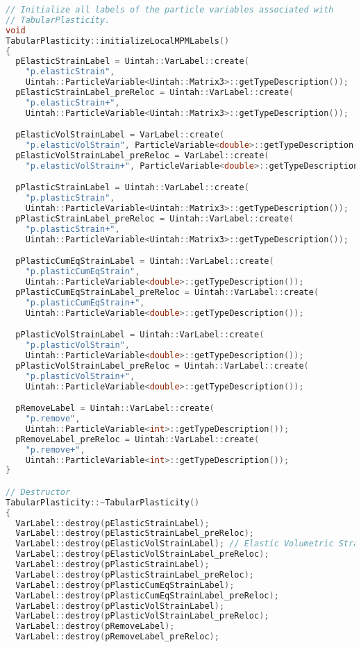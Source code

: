 \begin{enumerate}
\begin{lstlisting}[language=Cpp]
// Initialize all labels of the particle variables associated with
// TabularPlasticity.
void
TabularPlasticity::initializeLocalMPMLabels()
{
  pElasticStrainLabel = Uintah::VarLabel::create(
    "p.elasticStrain",
    Uintah::ParticleVariable<Uintah::Matrix3>::getTypeDescription());
  pElasticStrainLabel_preReloc = Uintah::VarLabel::create(
    "p.elasticStrain+",
    Uintah::ParticleVariable<Uintah::Matrix3>::getTypeDescription());

  pElasticVolStrainLabel = VarLabel::create(
    "p.elasticVolStrain", ParticleVariable<double>::getTypeDescription());
  pElasticVolStrainLabel_preReloc = VarLabel::create(
    "p.elasticVolStrain+", ParticleVariable<double>::getTypeDescription());

  pPlasticStrainLabel = Uintah::VarLabel::create(
    "p.plasticStrain",
    Uintah::ParticleVariable<Uintah::Matrix3>::getTypeDescription());
  pPlasticStrainLabel_preReloc = Uintah::VarLabel::create(
    "p.plasticStrain+",
    Uintah::ParticleVariable<Uintah::Matrix3>::getTypeDescription());

  pPlasticCumEqStrainLabel = Uintah::VarLabel::create(
    "p.plasticCumEqStrain",
    Uintah::ParticleVariable<double>::getTypeDescription());
  pPlasticCumEqStrainLabel_preReloc = Uintah::VarLabel::create(
    "p.plasticCumEqStrain+",
    Uintah::ParticleVariable<double>::getTypeDescription());

  pPlasticVolStrainLabel = Uintah::VarLabel::create(
    "p.plasticVolStrain",
    Uintah::ParticleVariable<double>::getTypeDescription());
  pPlasticVolStrainLabel_preReloc = Uintah::VarLabel::create(
    "p.plasticVolStrain+",
    Uintah::ParticleVariable<double>::getTypeDescription());

  pRemoveLabel = Uintah::VarLabel::create(
    "p.remove",
    Uintah::ParticleVariable<int>::getTypeDescription());
  pRemoveLabel_preReloc = Uintah::VarLabel::create(
    "p.remove+",
    Uintah::ParticleVariable<int>::getTypeDescription());
}

// Destructor
TabularPlasticity::~TabularPlasticity()
{
  VarLabel::destroy(pElasticStrainLabel);
  VarLabel::destroy(pElasticStrainLabel_preReloc);
  VarLabel::destroy(pElasticVolStrainLabel); // Elastic Volumetric Strain
  VarLabel::destroy(pElasticVolStrainLabel_preReloc);
  VarLabel::destroy(pPlasticStrainLabel);
  VarLabel::destroy(pPlasticStrainLabel_preReloc);
  VarLabel::destroy(pPlasticCumEqStrainLabel);
  VarLabel::destroy(pPlasticCumEqStrainLabel_preReloc);
  VarLabel::destroy(pPlasticVolStrainLabel);
  VarLabel::destroy(pPlasticVolStrainLabel_preReloc);
  VarLabel::destroy(pRemoveLabel);
  VarLabel::destroy(pRemoveLabel_preReloc);


\end{lstlisting}
\end{enumerate}
